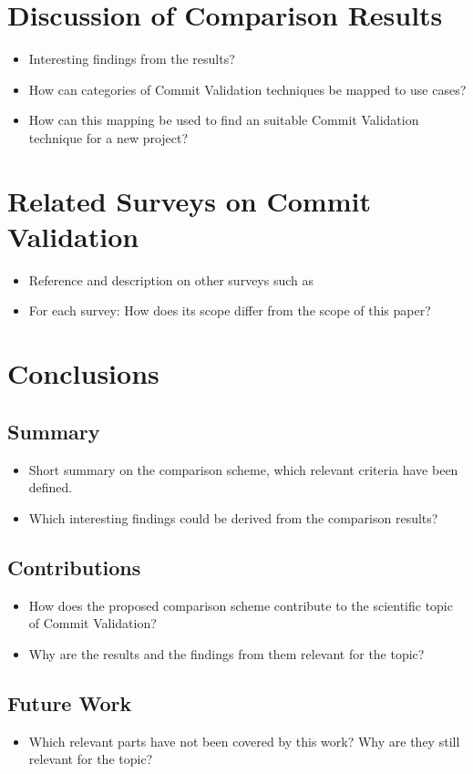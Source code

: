 \section{Discussion of Comparison Results}
\begin{itemize}
	\item Interesting findings from the results?
	\item How can categories of Commit Validation techniques be mapped to use cases?
	\item How can this mapping be used to find an suitable Commit Validation technique for a new project?
\end{itemize}


\section{Related Surveys on Commit Validation}
\begin{itemize}
	\item Reference and description on other surveys such as \cite{Kim2008,Catolino2019,Syed2019,Yang2016}
	\item For each survey: How does its scope differ from the scope of this paper?
\end{itemize}


\section{Conclusions}

\subsection{Summary}
\begin{itemize}
	\item Short summary on the comparison scheme, which relevant criteria have been defined.
	\item Which interesting findings could be derived from the comparison results?
\end{itemize}

\subsection{Contributions}
\begin{itemize}
	\item How does the proposed comparison scheme contribute to the scientific topic of Commit Validation?
	\item Why are the results and the findings from them relevant for the topic?
\end{itemize}

\subsection{Future Work}
\begin{itemize}
	\item Which relevant parts have not been covered by this work? Why are they still relevant for the topic?
\end{itemize}
